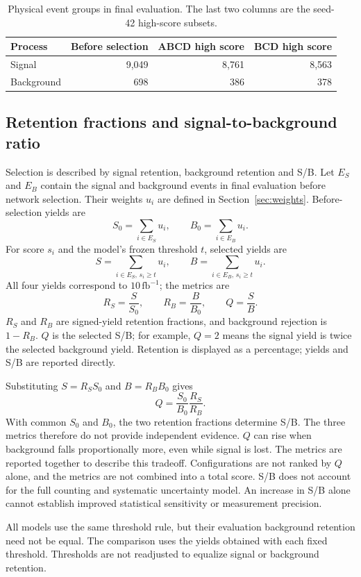 \documentclass[11pt,a4paper]{article}
\begin{document}
\begin{table}[H]
\caption{Physical event groups in final evaluation. The last two columns are the seed-42 high-score subsets.}
\label{tab:groups}
\centering
\begin{tabular}{lrrr}
\toprule
Process & Before selection & ABCD high score & BCD high score \\
\midrule
Signal & 9,049 & 8,761 & 8,563 \\
Background & 698 & 386 & 378 \\
\bottomrule
\end{tabular}
\end{table}

\subsection{Retention fractions and signal-to-background ratio}
Selection is described by signal retention, background retention and S/B.
Let $E_S$ and $E_B$ contain the signal and background events in final evaluation before network selection. Their weights $u_i$ are defined in Section~\ref{sec:weights}.
Before-selection yields are
\[
 S_0=\sum_{i\in E_S}u_i,\qquad
 B_0=\sum_{i\in E_B}u_i.
\]
For score $s_i$ and the model's frozen threshold $t$, selected yields are
\[
 S=\sum_{i\in E_S,\,s_i\geq t}u_i,\qquad
 B=\sum_{i\in E_B,\,s_i\geq t}u_i.
\]
All four yields correspond to $10\,\mathrm{fb}^{-1}$; the metrics are
\[
 R_S=\frac{S}{S_0},\qquad R_B=\frac{B}{B_0},\qquad Q=\frac{S}{B}.
\]
$R_S$ and $R_B$ are signed-yield retention fractions, and background rejection is $1-R_B$.
$Q$ is the selected S/B; for example, $Q=2$ means the signal yield is twice the selected background yield.
Retention is displayed as a percentage; yields and S/B are reported directly.

Substituting $S=R_SS_0$ and $B=R_BB_0$ gives
\[
 Q=\frac{S_0}{B_0}\frac{R_S}{R_B}.
\]
With common $S_0$ and $B_0$, the two retention fractions determine S/B. The three metrics therefore do not provide independent evidence.
$Q$ can rise when background falls proportionally more, even while signal is lost.
The metrics are reported together to describe this tradeoff. Configurations are not ranked by $Q$ alone, and the metrics are not combined into a total score.
S/B does not account for the full counting and systematic uncertainty model. An increase in S/B alone cannot establish improved statistical sensitivity or measurement precision.

All models use the same threshold rule, but their evaluation background retention need not be equal.
The comparison uses the yields obtained with each fixed threshold. Thresholds are not readjusted to equalize signal or background retention.
\end{document}
